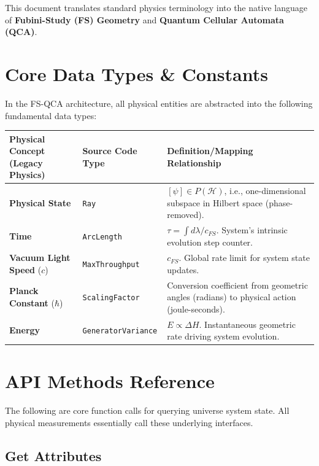 \documentclass[11pt,a4paper,twoside]{book}
\begin{document}
This document translates standard physics terminology into the native language of \textbf{Fubini-Study (FS) Geometry} and \textbf{Quantum Cellular Automata (QCA)}.

\section{Core Data Types \& Constants}

In the FS-QCA architecture, all physical entities are abstracted into the following fundamental data types:

\begin{table}[h]
\centering
\begin{tabular}{|l|l|l|}
\hline
\textbf{Physical Concept (Legacy Physics)} & \textbf{Source Code Type} & \textbf{Definition/Mapping Relationship} \\
\hline
\textbf{Physical State} & \texttt{Ray} & $[\psi] \in P(\mathcal{H})$, i.e., one-dimensional subspace in Hilbert space (phase-removed). \\
\hline
\textbf{Time} & \texttt{ArcLength} & $\tau = \int d\lambda / c_{FS}$. System's intrinsic evolution step counter. \\
\hline
\textbf{Vacuum Light Speed} ($c$) & \texttt{MaxThroughput} & $c_{FS}$. Global rate limit for system state updates. \\
\hline
\textbf{Planck Constant} ($\hbar$) & \texttt{ScalingFactor} & Conversion coefficient from geometric angles (radians) to physical action (joule-seconds). \\
\hline
\textbf{Energy} & \texttt{GeneratorVariance} & $E \propto \Delta H$. Instantaneous geometric rate driving system evolution. \\
\hline
\end{tabular}
\end{table}

\section{API Methods Reference}

The following are core function calls for querying universe system state. All physical measurements essentially call these underlying interfaces.

\subsection{Get Attributes}
\end{document}
